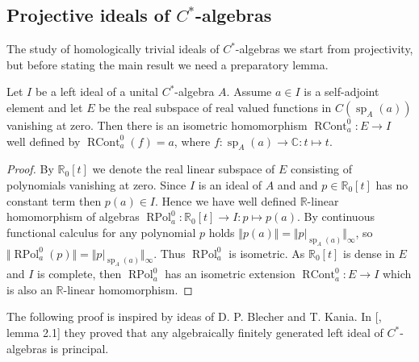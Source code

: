 
\subsection{
    Projective ideals of \texorpdfstring{$C^*$}{C*}-algebras
}\label{SubSectionProjectiveIdealsOfCStarAlgebras}

The study of homologically trivial ideals of $C^*$-algebras we start from
projectivity, but before stating the main result we need a preparatory lemma.

\begin{lemma}\label{ContFuncCalcOnIdealOfCStarAlg} Let $I$ be a left ideal of a
unital $C^*$-algebra $A$. Assume $a\in I$ is a self-adjoint element and let $E$
be the real subspace of real valued functions in $C(\operatorname{sp}_A(a))$
vanishing at zero. Then there is an isometric homomorphism
$\operatorname{RCont}_a^0:E\to I$ well defined by
$\operatorname{RCont}_a^0(f)=a$, where
$f:\operatorname{sp}_A(a)\to\mathbb{C}:t\mapsto t$.
\end{lemma}
\begin{proof} By $\mathbb{R}_0[t]$ we denote the real linear subspace of $E$
consisting of polynomials vanishing at zero. Since $I$ is an ideal of $A$ and
and $p\in\mathbb{R}_0[t]$ has no constant term then $p(a)\in I$.  Hence we have
well defined $\mathbb{R}$-linear homomorphism of algebras
$\operatorname{RPol}_a^0:\mathbb{R}_0[t]\to I:p\mapsto p(a)$. By continuous
functional calculus for any polynomial $p$ 
holds $\Vert p(a)\Vert=\Vert p|_{\operatorname{sp}_A(a)}\Vert_\infty$, so
$\Vert\operatorname{RPol}_a^0(p)\Vert
=\Vert p|_{\operatorname{sp}_A(a)}\Vert_\infty$. 
Thus $\operatorname{RPol}_a^0$ is isometric. 
As $\mathbb{R}_0[t]$ is dense in $E$ and $I$ is complete, then
$\operatorname{RPol}_a^0$ has an isometric extension
$\operatorname{RCont}_a^0:E\to I$ which is also an $\mathbb{R}$-linear
homomorphism. 
\end{proof}

The following proof is inspired by ideas of D. P. Blecher and T. Kania. In
[\cite{BleKanFinGenCStarAlgHilbMod}, lemma 2.1] they proved that any
algebraically finitely generated left ideal of $C^*$-algebras is principal.  

